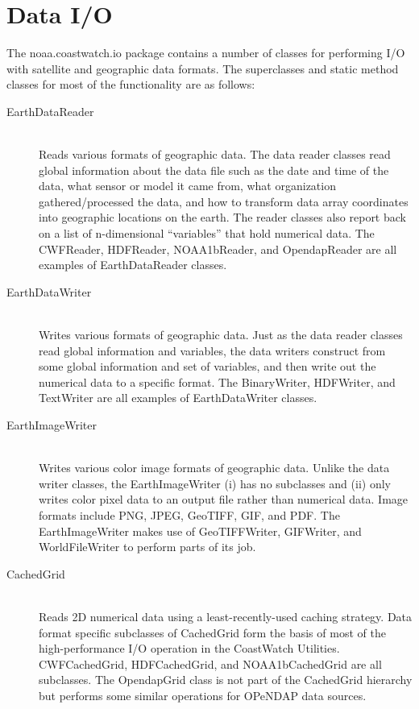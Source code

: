 \section{Data I/O}

The {\java noaa.coastwatch.io} package contains a number of classes for
performing I/O with satellite and geographic data formats.  The
superclasses and static method classes for most of the functionality
are as follows:
\begin{description}

\item[{\java EarthDataReader}]~\\ Reads various formats of
geographic data.  The data reader classes read global information
about the data file such as the date and time of the data, what
sensor or model it came from, what organization
gathered/processed the data, and how to transform data array
coordinates into geographic locations on the earth.  The reader
classes also report back on a list of n-dimensional ``variables''
that hold numerical data.  The {\java CWFReader}, {\java HDFReader},
{\java NOAA1bReader}, and {\java OpendapReader} are all examples of
{\java EarthDataReader} classes.

\item[{\java EarthDataWriter}]~\\ Writes various formats of
geographic data.  Just as the data reader classes read global
information and variables, the data writers construct from some
global information and set of variables, and then write out the
numerical data to a specific format.  The {\java BinaryWriter},
{\java HDFWriter}, and {\java TextWriter} are all examples of {\java
EarthDataWriter} classes.

\item[{\java EarthImageWriter}]~\\ Writes various color image
formats of geographic data.  Unlike the data writer classes, the
{\java EarthImageWriter} (i) has no subclasses and (ii) only writes
color pixel data to an output file rather than numerical data.
Image formats include PNG, JPEG, GeoTIFF, GIF, and PDF.  The {\java
EarthImageWriter} makes use of {\java GeoTIFFWriter}, {\java
GIFWriter}, and {\java WorldFileWriter} to perform parts of its
job.

\item[{\java CachedGrid}]~\\ Reads 2D numerical data using a
least-recently-used caching strategy.  Data format specific
subclasses of {\java CachedGrid} form the basis of most of the
high-performance I/O operation in the CoastWatch Utilities.  {\java
CWFCachedGrid}, {\java HDFCachedGrid}, and {\java NOAA1bCachedGrid}
are all subclasses.  The {\java OpendapGrid} class is not part of
the {\java CachedGrid} hierarchy but performs some similar
operations for OPeNDAP data sources.


\end{description}
